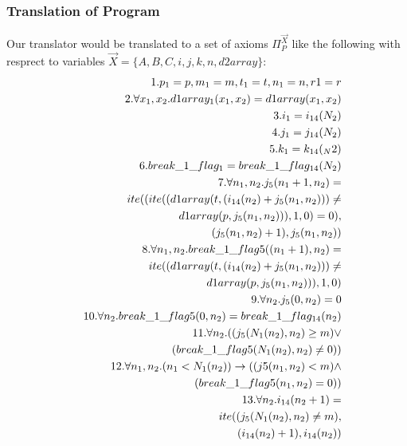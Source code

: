 \subsubsection{Translation of Program}\label{example_details2} 

Our translator would be translated to a set of axioms $\Pi_P^{\vec{X}}$ like the following with resprect to variables $\vec{X}=\{A, B, C, i, j, k, n, d2array\}$:
\begin{eqnarray*}
	&&1. p_1 = p, m_1 = m, t_1 = t, n_1 = n, r1 = r\\
	&&2.\forall x_1,x_2.d1array_1(x_1,x_2) = d1array(x_1,x_2)\\
	&&3.i_1 = i_{14}(N_2)\\
	&&4.j_1 = j_{14}(N_2)\\
	&&5.k_1 = k_{14}(_N2)\\
	&&6.break\_1\_flag_1 = break\_1\_flag_{14}(N_2)\\
	&&7.\forall n_1,n_2.j_5(n_1+1,n_2) =\\ &&\hspace*{2em}ite((ite((d1array(t,(i_{14}(n_2)+j_5(n_1,n_2)))\not=\\
	&&\hspace*{6em}d1array(p,j_5(n_1,n_2))),1,0)=0),\\
	&&\hspace*{9em}(j_5(n_1,n_2)+1),j_5(n_1,n_2))\\
	&&8.\forall n_1,n_2.break\_1\_flag5((n_1+1),n_2) =\\ &&\hspace*{4em}ite((d1array(t,(i_{14}(n_2)+j_5(n_1,n_2)))\not=\\
	&&\hspace*{9em}d1array(p,j_{5}(n_1,n_2))),1,0)\\
	&&9.\forall n_2.j_{5}(0,n_2) = 0\\
	&&10.\forall n_2.break\_1\_flag5(0,n_2) = break\_1\_flag_{14}(n_2)\\
	&&11.\forall n_2.((j_5(N_1(n_2),n_2)\geq m) \lor \\
	&&\hspace*{7em} (break\_1\_flag5(N_1(n_2),n_2)\not=0))\\
	&&12.\forall n_1,n_2.(n_1<N_1(n_2)) \rightarrow ((j5(n_1,n_2)<m) \land\\
	&&\hspace*{9em} (break\_1\_flag5(n_1,n_2)=0))\\
	&&13.\forall n_2.i_{14}(n_2+1) =\\ 
	&&\hspace*{7em}ite((j_5(N_1(n_2),n_2)\not=m),\\
	&&\hspace*{10em}(i_{14}(n_2)+1),i_{14}(n_2))\\
\end{eqnarray*}
